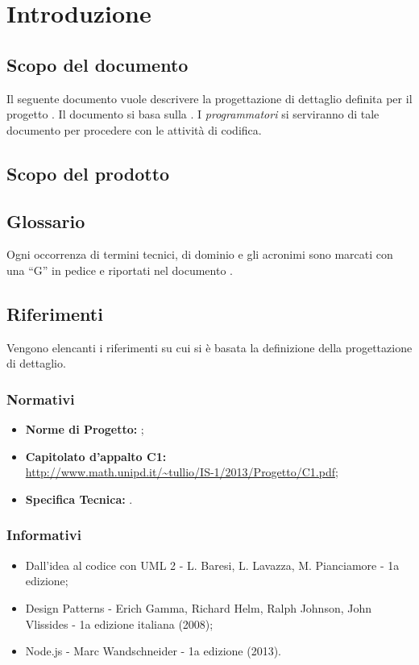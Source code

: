 \section{Introduzione}


\subsection{Scopo del documento}
Il seguente documento vuole descrivere la progettazione di dettaglio definita per il progetto \ProjectName{}. Il documento si basa sulla \SpecificaTecnica{}. I \textit{programmatori} si serviranno di tale documento per procedere con le attività di codifica.

\subsection{Scopo del prodotto}
\ScopoDelProdotto 

\subsection{Glossario}
Ogni occorrenza di termini tecnici, di dominio e gli acronimi sono marcati con una ``G'' in pedice e riportati nel documento \Glossario{}.

\subsection{Riferimenti}
Vengono elencanti i riferimenti su cui si è basata la definizione della progettazione di dettaglio.
	\subsubsection{Normativi}
		\begin{itemize}
  			\item \textbf{Norme di Progetto:}  \NormeDiProgetto;
			\item \textbf{Capitolato d'appalto C1:} \\ \url{http://www.math.unipd.it/~tullio/IS-1/2013/Progetto/C1.pdf};
			\item \textbf{Specifica Tecnica:} \SpecificaTecnica{}.
		\end{itemize}
	\subsubsection{Informativi}
		\begin{itemize}
			\item Dall’idea al codice con UML 2 - L. Baresi, L. Lavazza, M. Pianciamore - 1a edizione;
			\item Design Patterns - Erich Gamma, Richard Helm, Ralph Johnson, John Vlissides - 1a edizione italiana (2008);
			\item Node.js - Marc Wandschneider - 1a edizione (2013).
		\end{itemize}
	

